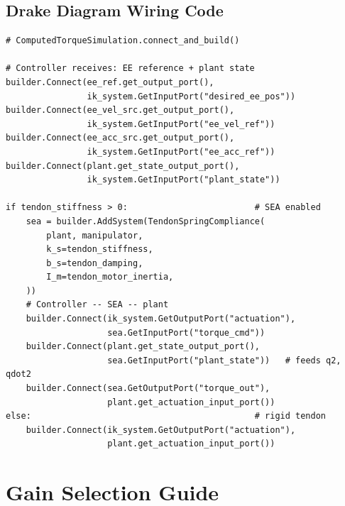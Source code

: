 \documentclass[11pt, a4paper]{article}
\begin{document}
\subsection{Drake Diagram Wiring Code}

\begin{lstlisting}
# ComputedTorqueSimulation.connect_and_build()

# Controller receives: EE reference + plant state
builder.Connect(ee_ref.get_output_port(),
                ik_system.GetInputPort("desired_ee_pos"))
builder.Connect(ee_vel_src.get_output_port(),
                ik_system.GetInputPort("ee_vel_ref"))
builder.Connect(ee_acc_src.get_output_port(),
                ik_system.GetInputPort("ee_acc_ref"))
builder.Connect(plant.get_state_output_port(),
                ik_system.GetInputPort("plant_state"))

if tendon_stiffness > 0:                         # SEA enabled
    sea = builder.AddSystem(TendonSpringCompliance(
        plant, manipulator,
        k_s=tendon_stiffness,
        b_s=tendon_damping,
        I_m=tendon_motor_inertia,
    ))
    # Controller -- SEA -- plant
    builder.Connect(ik_system.GetOutputPort("actuation"),
                    sea.GetInputPort("torque_cmd"))
    builder.Connect(plant.get_state_output_port(),
                    sea.GetInputPort("plant_state"))   # feeds q2, qdot2
    builder.Connect(sea.GetOutputPort("torque_out"),
                    plant.get_actuation_input_port())
else:                                            # rigid tendon
    builder.Connect(ik_system.GetOutputPort("actuation"),
                    plant.get_actuation_input_port())
\end{lstlisting}

\section{Gain Selection Guide}
\end{document}
